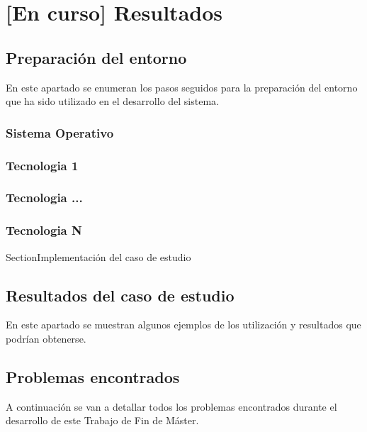 \chapter{[En curso] Resultados}
\label{chapter:resultados}


\section{Preparación del entorno}
En este apartado se enumeran los pasos seguidos para la preparación del entorno que ha sido utilizado en el desarrollo del sistema.

\subsection{Sistema Operativo}


\subsection{Tecnologia 1}
\subsection{Tecnologia ...}
\subsection{Tecnologia N}

Section{Implementación del caso de estudio} \label{Implementación del caso de estudio}


\section{Resultados del caso de estudio}

En este apartado se muestran algunos ejemplos de los utilización y resultados que podrían obtenerse.

\section{Problemas encontrados}

A continuación se van a detallar todos los problemas encontrados durante el desarrollo
de este Trabajo de Fin de Máster.

